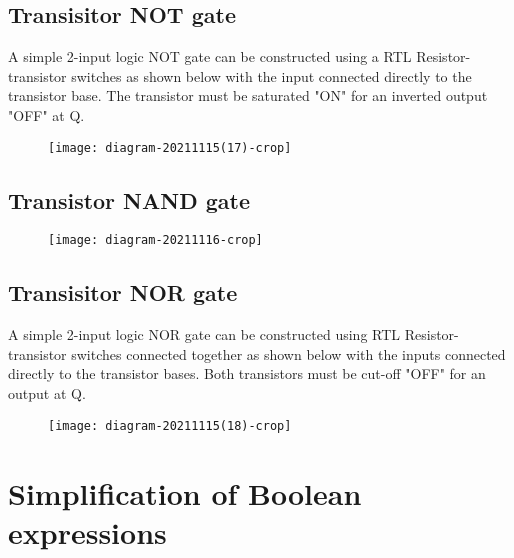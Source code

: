 \subsection{Transisitor NOT gate}
A simple 2-input logic NOT gate can be constructed using a RTL Resistor-transistor switches as shown below with the input connected directly to the transistor base. The transistor must be saturated "ON" for an inverted output "OFF" at Q.\\
\begin{figure}[H]
	\centering
	\texttt{[image: diagram-20211115(17)-crop]}
	\caption{}
	\label{}
\end{figure}
\subsection{Transistor NAND gate}
\begin{figure}[H]
	\centering
	\texttt{[image: diagram-20211116-crop]}
\end{figure}
\subsection{Transisitor NOR gate}
A simple 2-input logic NOR gate can be constructed using RTL Resistor-transistor switches connected together as shown below with the inputs connected directly to the transistor bases. Both transistors must be cut-off "OFF" for an output at Q.\\
\begin{figure}[H]
	\centering
	\texttt{[image: diagram-20211115(18)-crop]}
	\caption{}
	\label{}
\end{figure}
\section{Simplification of Boolean expressions}
